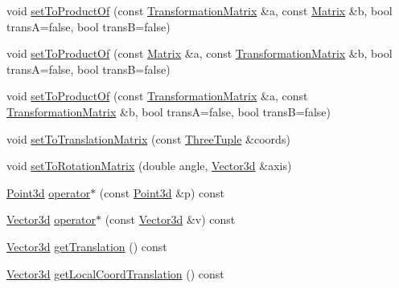 \begin{DoxyCompactItemize}
\item 
void \hyperlink{classCartWheel_1_1Math_1_1TransformationMatrix_af09f5e22d3a79523605c165afa9313f5}{setToProductOf} (const \hyperlink{classCartWheel_1_1Math_1_1TransformationMatrix}{TransformationMatrix} \&a, const \hyperlink{classCartWheel_1_1Math_1_1Matrix}{Matrix} \&b, bool transA=false, bool transB=false)
\item 
void \hyperlink{classCartWheel_1_1Math_1_1TransformationMatrix_a459a4175b579a8dd41140dcef09818a7}{setToProductOf} (const \hyperlink{classCartWheel_1_1Math_1_1Matrix}{Matrix} \&a, const \hyperlink{classCartWheel_1_1Math_1_1TransformationMatrix}{TransformationMatrix} \&b, bool transA=false, bool transB=false)
\item 
void \hyperlink{classCartWheel_1_1Math_1_1TransformationMatrix_acafb69b3be898884d38aa47e72b25d31}{setToProductOf} (const \hyperlink{classCartWheel_1_1Math_1_1TransformationMatrix}{TransformationMatrix} \&a, const \hyperlink{classCartWheel_1_1Math_1_1TransformationMatrix}{TransformationMatrix} \&b, bool transA=false, bool transB=false)
\item 
void \hyperlink{classCartWheel_1_1Math_1_1TransformationMatrix_a309ebb736c07ce6a94b3a5446e139936}{setToTranslationMatrix} (const \hyperlink{classCartWheel_1_1Math_1_1ThreeTuple}{ThreeTuple} \&coords)
\item 
void \hyperlink{classCartWheel_1_1Math_1_1TransformationMatrix_a1f77e7d1728a2acccfdedd8accd0cab1}{setToRotationMatrix} (double angle, \hyperlink{classCartWheel_1_1Math_1_1Vector3d}{Vector3d} \&axis)
\item 
\hyperlink{classCartWheel_1_1Math_1_1Point3d}{Point3d} \hyperlink{classCartWheel_1_1Math_1_1TransformationMatrix_a51a96104914fd804898c192d8c8e1092}{operator$\ast$} (const \hyperlink{classCartWheel_1_1Math_1_1Point3d}{Point3d} \&p) const 
\item 
\hyperlink{classCartWheel_1_1Math_1_1Vector3d}{Vector3d} \hyperlink{classCartWheel_1_1Math_1_1TransformationMatrix_ac2b10ebee0e90020af600324b29174a5}{operator$\ast$} (const \hyperlink{classCartWheel_1_1Math_1_1Vector3d}{Vector3d} \&v) const 
\item 
\hyperlink{classCartWheel_1_1Math_1_1Vector3d}{Vector3d} \hyperlink{classCartWheel_1_1Math_1_1TransformationMatrix_a6eb44eb662417bb784567e3fb1c1b87e}{getTranslation} () const 
\item 
\hyperlink{classCartWheel_1_1Math_1_1Vector3d}{Vector3d} \hyperlink{classCartWheel_1_1Math_1_1TransformationMatrix_aced5f0672d1827854bf5fad2a2e0ed15}{getLocalCoordTranslation} () const 

\end{DoxyCompactItemize}
